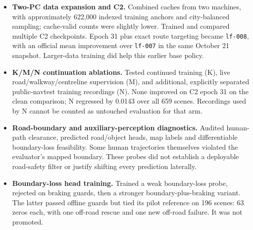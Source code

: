\begin{itemize}
\item \textbf{Two-PC data expansion and C2.} Combined caches from two machines, with approximately 622,000 indexed training anchors and city-balanced sampling; cache-valid counts were slightly lower. Trained and compared multiple C2 checkpoints. Epoch 31 plus exact route targeting became \texttt{lf-008}, with an official mean improvement over \texttt{lf-007} in the same October 21 snapshot. Larger-data training did help this earlier base policy.
\item \textbf{K/M/N continuation ablations.} Tested continued training (K), live road/walkway/centreline supervision (M), and additional, explicitly separated public-navtest training recordings (N). None improved on C2 epoch 31 on the clean comparison; N regressed by 0.0143 over all 659 scenes. Recordings used by N cannot be counted as untouched evaluation for that arm.
\item \textbf{Road-boundary and auxiliary-perception diagnostics.} Audited human-path clearance, predicted road/object heads, map labels and differentiable boundary-loss feasibility. Some human trajectories themselves violated the evaluator's mapped boundary. These probes did not establish a deployable road-safety filter or justify shifting every prediction laterally.
\item \textbf{Boundary-loss head training.} Trained a weak boundary-loss probe, rejected on braking guards, then a stronger boundary-plus-braking variant. The latter passed offline guards but tied its pilot reference on 196 scenes: 63 zeros each, with one off-road rescue and one new off-road failure. It was not promoted.
\end{itemize}

